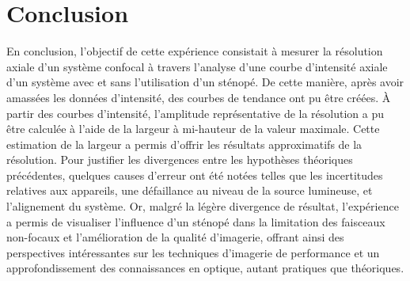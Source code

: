 \documentclass[11pt,letterpaper]{article}
\begin{document}
\section{Conclusion}
En conclusion, l'objectif de cette expérience consistait à mesurer la résolution axiale d'un système confocal à travers l'analyse d'une courbe d'intensité axiale d'un système avec et sans l'utilisation d'un sténopé. De cette manière, après avoir amassées les données d'intensité, des courbes de tendance ont pu être créées. À partir des courbes d'intensité, l'amplitude représentative de la résolution a pu être calculée à l'aide de la largeur à mi-hauteur de la valeur maximale. Cette estimation de la largeur a permis d'offrir les résultats approximatifs de la résolution. Pour justifier les divergences entre les hypothèses théoriques précédentes, quelques causes d'erreur ont été notées telles que les incertitudes relatives aux appareils, une défaillance au niveau de la source lumineuse, et l'alignement du système. Or, malgré la légère divergence de résultat, l'expérience a permis de visualiser l'influence d'un sténopé dans la limitation des faisceaux non-focaux et l'amélioration de la qualité d'imagerie, offrant ainsi des perspectives intéressantes sur les techniques d'imagerie de performance et un approfondissement des connaissances en optique, autant pratiques que théoriques.


\clearpage




\end{document}
